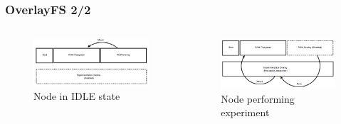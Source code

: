 \documentclass[usepdftitle=false,13pt]{beamer}
\begin{document}
\begin{frame}\frametitle{OverlayFS 2/2}


\begin{columns}[c] %
		\begin{figure}[h!]
		\begin{center}
		\includegraphics[width=1.0\textwidth]{pic/firmfs2}
		\caption{Node in IDLE state}
		\label{fig:wmn}
		\end{center}
		\end{figure}
  		\begin{figure}[h!]
		\begin{center}
		\includegraphics[width=1.0\textwidth]{pic/firmfs3}
		\caption{Node performing experiment}
		\label{fig:wmn}
		\end{center}
		\end{figure}  
   	\end{columns}

\end{frame}
\end{document}
